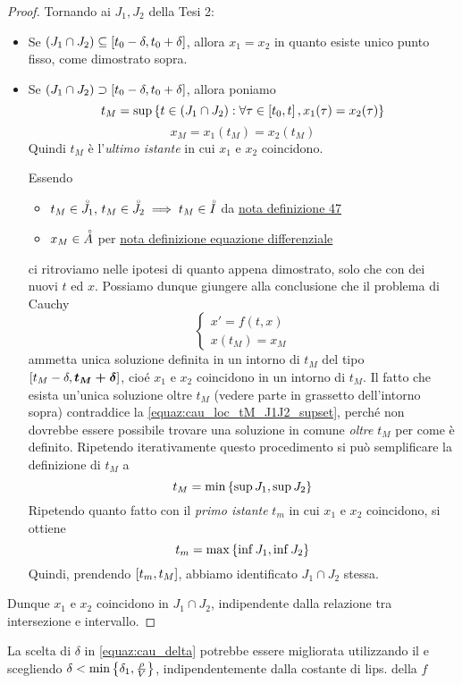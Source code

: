 \begin{proof}
	Tornando ai $J_1, J_2$ della Tesi 2:
	\begin{itemize}
		\item Se $(J_1 \cap J_2) \subseteq \left[t_0-\delta,t_0+\delta\right]$, allora $x_1 = x_2$ in quanto esiste unico punto fisso, come dimostrato sopra.
		\item Se $(J_1 \cap J_2) \supset \left[t_0-\delta,t_0+\delta\right]$, allora poniamo
			\begin{equation}
				t_M = \sup \left\{t \in (J_1 \cap J_2): \forall \tau \in \left[t_0,t\right], x_1(\tau)=x_2(\tau)\right\}\label{equaz:cau_loc_tM_J1J2_supset}
			\end{equation}
			$$x_M = x_1(t_M) = x_2(t_M)$$
			Quindi $t_M$ è l'\textit{ultimo istante} in cui $x_1$ e $x_2$ coincidono.

			Essendo
			\begin{itemize}
				\item $t_M \in \accentset{\circ}{J_1},\,t_M \in \accentset{\circ}{J_2} \implies t_M \in \accentset{\circ}{I}$ da \hyperlink{note:diff_eq_sol_definit_set}{nota definizione 47}
				\item $x_M \in \accentset{\circ}{A}$ per \hyperlink{def:equaz_diff_sol}{nota definizione equazione differenziale}
			\end{itemize}
			ci ritroviamo nelle ipotesi di quanto appena dimostrato, solo che con dei nuovi $t$ ed $x$. Possiamo dunque giungere alla conclusione che il problema di Cauchy
			$$\begin{cases}x'=f(t,x)\\x(t_M)=x_M\end{cases}$$
			ammetta unica soluzione definita in un intorno di $t_M$ del tipo $\left[t_M-\delta,\boldsymbol{t_M+\delta}\right]$, cioé $x_1$ e $x_2$ coincidono in un intorno di $t_M$. Il fatto che esista un'unica soluzione oltre $t_M$ (vedere parte in grassetto dell'intorno sopra) contraddice la \ref{equaz:cau_loc_tM_J1J2_supset}, perché non dovrebbe essere possibile trovare una soluzione in comune \textit{oltre} $t_M$ per come è definito. Ripetendo iterativamente questo procedimento si può semplificare la definizione di $t_M$ a
			$$t_M = \min \left\{\sup J_1, \sup J_2\right\}$$
			Ripetendo quanto fatto con il \textit{primo istante} $t_m$ in cui $x_1$ e $x_2$ coincidono, si ottiene
			$$t_m = \max \left\{\inf J_1, \inf J_2\right\}$$
			Quindi, prendendo $\left[t_m,t_M\right]$, abbiamo identificato $J_1 \cap J_2$ stessa.
	\end{itemize}
	Dunque $x_1$ e $x_2$ coincidono in $J_1 \cap J_2$, indipendente dalla relazione tra intersezione e intervallo.
\end{proof}
\begin{note}
	La scelta di $\delta$ in \ref{equaz:cau_delta} potrebbe essere migliorata utilizzando il  e scegliendo $\delta<\min\left\{\delta_1,\frac{\rho}{V}\right\}$, indipendentemente dalla costante di lips. della $f$
\end{note}

